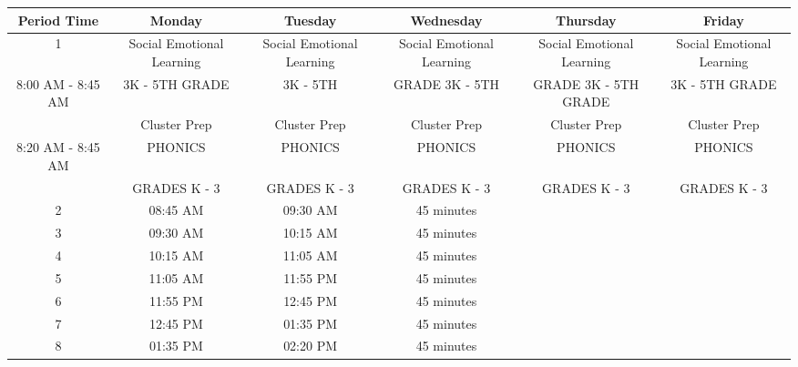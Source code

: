 \documentclass{article}
\begin{document}
\begin{center}
\begin{table}
    \begin{tabular}{|c|c|c|c|c|c|}
    \hline
     Period Time & Monday & Tuesday & Wednesday & Thursday & Friday \\  
    \hline
    \hline
    1 & Social Emotional Learning & Social Emotional Learning & Social Emotional Learning & Social Emotional Learning & Social Emotional Learning \\ \hline 8:00 AM - 8:45 AM & 3K - 5TH GRADE & 3K - 5TH & GRADE 3K - 5TH & GRADE 3K - 5TH GRADE & 3K - 5TH GRADE \\ & Cluster Prep & Cluster Prep & Cluster Prep & Cluster Prep & Cluster Prep \\ 8:20 AM - 8:45 AM & PHONICS & PHONICS & PHONICS & PHONICS & PHONICS \\ & GRADES K - 3 & GRADES K - 3 & GRADES K - 3 & GRADES K - 3 & GRADES K - 3 \\
    \hline
    2 & 08:45 AM & 09:30 AM & 45 minutes \\
    \hline
    3 & 09:30 AM & 10:15 AM & 45 minutes \\
    \hline
    4 & 10:15 AM & 11:05 AM & 45 minutes \\
    \hline
    5 & 11:05 AM & 11:55 PM & 45 minutes \\
    \hline
    6 & 11:55 PM & 12:45 PM & 45 minutes \\
    \hline
    7 & 12:45 PM & 01:35 PM & 45 minutes \\
    \hline
    8 & 01:35 PM & 02:20 PM & 45 minutes \\
    \hline
    \end{tabular}
    

\end{table}
\end{center}
\end{document}
